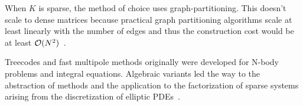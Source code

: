  When $K$ is sparse, the method of choice uses graph-partitioning. This doesn't scale to dense matrices because practical graph partitioning  algorithms scale at least linearly with the number of edges and thus the construction cost would be at least $\operatorname{\mathcal{O}}(N^2)$~\cite{agullo-darve-e16,karypis-kumar98}. 

 Treecodes and fast multipole methods originally were developed for N-body problems and integral equations. Algebraic variants led the way to the abstraction of \hmatrix{} methods and the application to the factorization of sparse systems arising from the discretization of elliptic PDEs~\cite{hackbusch15,bebendorf08,ambikasaran-13,greengard-gueyffier-martinsson-rokhlin09,ho-greengard12,xia-e10}. 

